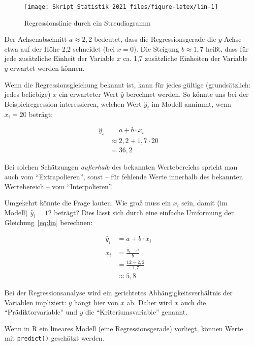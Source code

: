 \documentclass[
  11pt,
  ngerman,
  a4paper,
]{report}
\newenvironment{rtip}{
  \medskip
  \begin{tcolorbox}[colframe=purple,colback=light_gray,title=Softwarehinweis]
}{
  \end{tcolorbox}
  \medskip
}
\begin{document}
\begin{figure}[!h]

{\centering \texttt{[image: Skript\_Statistik\_2021\_files/figure-latex/lin-1]} 

}

\caption{Regressionslinie durch ein Streudiagramm}\label{fig:lin}
\end{figure}

Der Achsenabschnitt \(a\approx2,2\) bedeutet, dass die Regressionsgerade die \(y\)-Achse etwa auf der Höhe 2,2 schneidet (bei \(x=0\)). Die Steigung \(b\approx1,7\) heißt, dass für jede zusätzliche Einheit der Variable \(x\) ca. 1,7 zusätzliche Einheiten der Variable \(y\) erwartet werden können.

Wenn die Regressionsgleichung bekannt ist, kann für jedes gültige (grundsätzlich: jedes beliebige) \(x\) ein erwarteter Wert \(\hat{y}\) berechnet werden. So könnte uns bei der Beispielregression interessieren, welchen Wert \(\hat{y}_i\) im Modell annimmt, wenn \(x_i=20\) beträgt:

\[
\begin{aligned}
\hat{y}_i&=a+b\cdot x_i\\
   &\approx2{,}2+1{,}7\cdot20\\
   &=36{,}2
\end{aligned}
\]

Bei solchen Schätzungen \emph{außerhalb} des bekannten Wertebereichs spricht man auch vom \enquote{Extrapolieren}, sonst -- für fehlende Werte innerhalb des bekannten Wertebereich -- vom \enquote{Interpolieren}.

Umgekehrt könnte die Frage lauten: Wie groß muss ein \(x_i\) sein, damit (im Modell) \(\hat{y}_i=12\) beträgt? Dies lässt sich durch eine einfache Umformung der Gleichung~\eqref{eq:lin} berechnen:

\[
\begin{aligned}
\hat{y}_i&=a+b\cdot x_i\\[5pt]
x_i&=\frac{\hat{y}_i-a}{b}\\[5pt]
&=\frac{12-2{,}2}{1{,}7}\\
   &\approx5{,}8
\end{aligned}
\]

Bei der Regressionsanalyse wird ein gerichtetes Abhängigkeitsverhältnis der Variablen impliziert: \(y\) hängt hier von \(x\) ab. Daher wird \(x\) auch die \enquote{Prädiktorvariable} und \(y\) die \enquote{Kriteriumsvariable} genannt.

\begin{rtip}
Wenn in R ein lineares Modell (eine Regressionsgerade) vorliegt, können Werte mit \verb|predict()| geschätzt werden.
\end{rtip}
\end{document}
